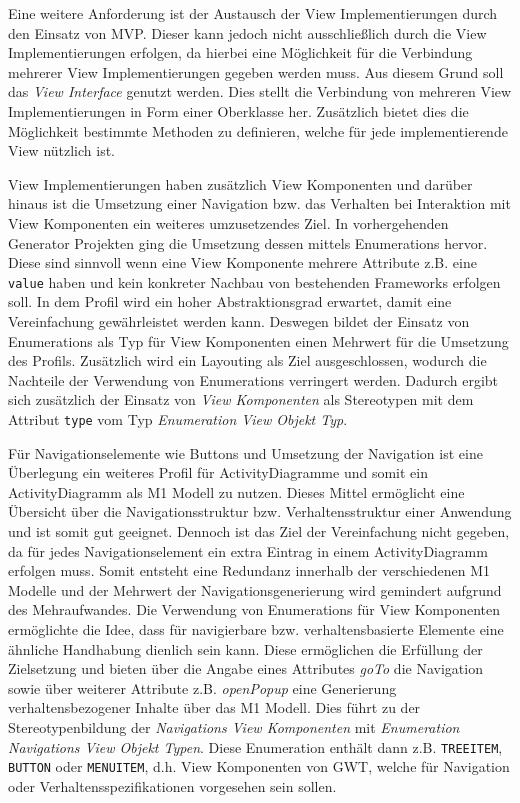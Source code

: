 Eine weitere Anforderung ist der Austausch der View Implementierungen durch den
Einsatz von MVP. Dieser kann jedoch nicht ausschließlich durch die View
Implementierungen erfolgen, da hierbei eine Möglichkeit für die
Verbindung mehrerer View Implementierungen gegeben werden muss. Aus diesem Grund
soll das \textit{View Interface} genutzt werden. Dies stellt die Verbindung von mehreren
View Implementierungen in Form einer Oberklasse her. Zusätzlich bietet dies die
Möglichkeit bestimmte Methoden zu definieren, welche für jede implementierende
View nützlich ist. 

View Implementierungen haben zusätzlich View Komponenten und darüber hinaus ist
die Umsetzung einer Navigation bzw. das Verhalten bei Interaktion mit
View Komponenten ein weiteres umzusetzendes Ziel. In vorhergehenden Generator
Projekten ging die Umsetzung dessen mittels Enumerations hervor. Diese sind
sinnvoll wenn eine View Komponente mehrere Attribute z.B. eine \texttt{value}
haben und kein konkreter Nachbau von bestehenden Frameworks erfolgen soll. In dem Profil
wird ein hoher Abstraktionsgrad erwartet, damit eine Vereinfachung gewährleistet
werden kann. Deswegen bildet der Einsatz von Enumerations als Typ für
View Komponenten einen Mehrwert für die Umsetzung des Profils. Zusätzlich wird ein Layouting als
Ziel ausgeschlossen, wodurch die Nachteile der Verwendung von Enumerations
verringert werden. Dadurch ergibt sich zusätzlich der Einsatz von \textit{View
Komponenten} als Stereotypen mit dem Attribut \texttt{type} vom Typ
\textit{Enumeration View Objekt Typ}.

Für Navigationselemente wie Buttons und Umsetzung der Navigation ist eine
Überlegung ein weiteres Profil für ActivityDiagramme und somit ein
ActivityDiagramm als M1 Modell zu nutzen. Dieses Mittel ermöglicht eine
Übersicht über die Navigationsstruktur bzw. Verhaltensstruktur einer Anwendung
und ist somit gut geeignet. Dennoch ist das Ziel der Vereinfachung nicht
gegeben, da für jedes Navigationselement ein extra Eintrag in einem
ActivityDiagramm erfolgen muss. Somit entsteht eine Redundanz innerhalb der
verschiedenen M1 Modelle und der Mehrwert der Navigationsgenerierung wird
gemindert aufgrund des Mehraufwandes. Die Verwendung von Enumerations für View
Komponenten ermöglichte die Idee, dass für navigierbare bzw. verhaltensbasierte
Elemente eine ähnliche Handhabung dienlich sein kann. Diese ermöglichen die Erfüllung der
Zielsetzung und bieten über die Angabe eines Attributes \textit{goTo} die
Navigation sowie über weiterer Attribute z.B. \textit{openPopup} eine
Generierung verhaltensbezogener Inhalte über das M1 Modell. Dies führt zu der
Stereotypenbildung der \textit{Navigations View Komponenten} mit
\textit{Enumeration Navigations View Objekt Typen}. Diese Enumeration enthält
dann z.B. \texttt{TREEITEM}, \texttt{BUTTON} oder \texttt{MENUITEM}, d.h. View
Komponenten von GWT, welche für Navigation oder Verhaltensspezifikationen vorgesehen sein sollen.

